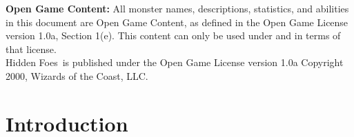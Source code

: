 \documentclass[letterpaper, 12pt, twocolumn]{article}
\title{\projecttitle}
\author{Alex Gestwicki}
\def\projecttitle{Hidden Foes}
\begin{document}
\maketitle
\RaggedRight
\clearpage
\textbf{Open Game Content:} All monster names, descriptions, statistics, and abilities in this document are Open Game Content, as
defined in the Open Game License version 1.0a, Section 1(e). This content can only be used under and in terms of that license.
\\\bigskip
\projecttitle\ is published under the Open Game License version 1.0a Copyright 2000, Wizards of the Coast, LLC.
\newpage
\tableofcontents
\clearpage
\section*{Introduction}
\clearpage


\clearpage

\end{document}

